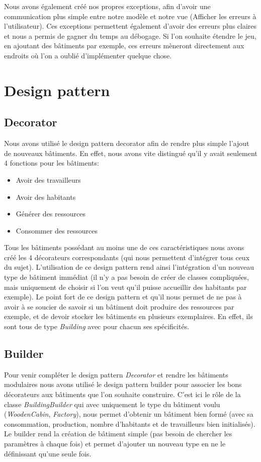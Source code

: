 \documentclass{article}
\begin{document}
Nous avons également créé nos propres exceptions, afin d'avoir une communication plus simple entre notre modèle et notre vue
(Afficher les erreurs à l'utilisateur). Ces exceptions permettent également d'avoir des erreurs plus claires et nous a permis
de gagner du temps au débogage. Si l'on souhaite étendre le jeu, en ajoutant des bâtiments par exemple, ces erreurs mèneront
directement aux endroits où  l'on a oublié d'implémenter quelque chose.
\section{Design pattern}
\subsection{Decorator}
Nous avons utilisé le design pattern decorator afin de rendre plus simple l'ajout de nouveaux bâtiments.
En effet, nous avons vite distingué qu'il y avait seulement 4 fonctions pour les bâtiments:
\begin{itemize}
    \item Avoir des travailleurs
    \item Avoir des habitants
    \item Générer des ressources
    \item Consommer des ressources
\end{itemize}
Tous les bâtiments possédant au moins une de ces caractéristiques nous avons créé les 4 décorateurs correspondants
(qui nous permettent d'intégrer tous ceux du sujet). L'utilisation de ce design pattern rend ainsi l'intégration
d'un nouveau type de bâtiment immédiat (il n'y a pas besoin de créer de classes compliquées, mais uniquement de choisir
si l'on veut qu'il puisse accueillir des habitants par exemple). Le point fort de ce design pattern et qu'il nous permet
de ne pas à avoir à se soucier de savoir si un bâtiment doit produire des ressources par exemple, et de devoir stocker les
bâtiments en plusieurs exemplaires. En effet, ils sont tous de type \textit{Building} avec pour chacun ses spécificités.

\subsection{Builder}
Pour venir compléter le design pattern \textit{Decorator} et rendre les bâtiments modulaires nous avons utilisé le design
pattern builder pour associer les bons décorateurs aux bâtiments que l'on souhaite construire. C'est ici le rôle de la
classe \textit{BuildingBuilder} qui avec uniquement le type du bâtiment voulu (\textit{WoodenCabin}, \textit{Factory}), 
nous permet d'obtenir un bâtiment bien formé (avec sa consommation, production, nombre d'habitants et de travailleurs bien 
initialisés). Le builder rend la création de bâtiment simple (pas besoin de chercher les paramètres à chaque fois) et permet 
d'ajouter un nouveau type en ne le définissant qu'une seule fois.
\end{document}
